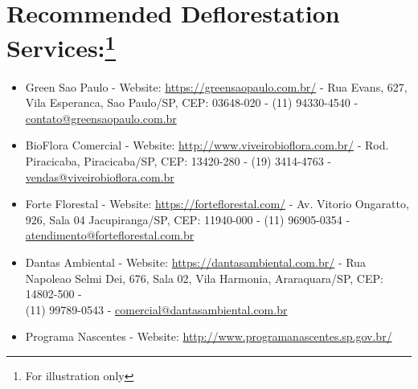 \documentclass{article}
\begin{document}
    \section{Recommended Deflorestation Services:\protect\footnote{For illustration only}}
    \begin{itemize}
        \item Green Sao Paulo - Website: \url{https://greensaopaulo.com.br/} - Rua Evans, 627, Vila Esperanca, Sao Paulo/SP, CEP: 03648-020 - (11) 94330-4540 - \href{mailto:contato@greensaopaulo.com.br}{contato@greensaopaulo.com.br}
        \item BioFlora Comercial - Website: \url{http://www.viveirobioflora.com.br/} - Rod. Piracicaba, Piracicaba/SP, CEP: 13420-280 - (19) 3414-4763 - \href{mailto:vendas@viveirobioflora.com.br}{vendas@viveirobioflora.com.br}
        \item Forte Florestal - Website: \url{https://forteflorestal.com/} - Av. Vitorio Ongaratto, 926, Sala 04 Jacupiranga/SP, CEP: 11940-000 -  (11) 96905-0354 - \href{mailto:atendimento@forteflorestal.com.br}{atendimento@forteflorestal.com.br}
        \item Dantas Ambiental - Website: \url{https://dantasambiental.com.br/} - Rua Napoleao Selmi Dei, 676, Sala 02, Vila Harmonia, Araraquara/SP, CEP: 14802-500 -\\ (11) 99789-0543 - \href{mailto:comercial@dantasambiental.com.br}{comercial@dantasambiental.com.br}
        \item Programa Nascentes - Website: \url{http://www.programanascentes.sp.gov.br/}


        
    \end{itemize}

    \vspace{25pt}


    
\end{document}
